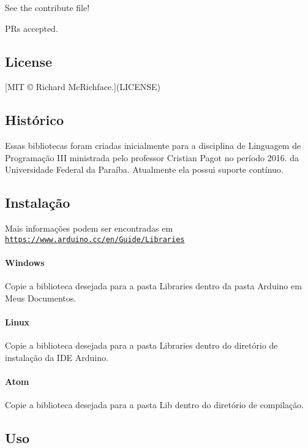 See the contribute file!

P\+Rs accepted.

\subsection*{License}

\mbox{[}M\+IT © Richard Mc\+Richface.\mbox{]}(L\+I\+C\+E\+N\+SE)

\subsection*{Histórico}

Essas bibliotecas foram criadas inicialmente para a disciplina de Linguagem de Programação I\+II ministrada pelo professor Cristian Pagot no período 2016. da Universidade Federal da Paraíba. Atualmente ela possui suporte contínuo.

\subsection*{Instalação}

Mais informações podem ser encontradas em \href{https://www.arduino.cc/en/Guide/Libraries}{\tt https\+://www.\+arduino.\+cc/en/\+Guide/\+Libraries} \paragraph*{Windows}

Copie a biblioteca desejada para a pasta {\ttfamily Libraries} dentro da pasta {\ttfamily Arduino} em {\ttfamily Meus Documentos}.

\paragraph*{Linux}

Copie a biblioteca desejada para a pasta {\ttfamily Libraries} dentro do diretório de instalação da I\+DE Arduino.

\paragraph*{Atom}

Copie a biblioteca desejada para a pasta {\ttfamily Lib} dentro do diretório de compilação.

\subsection*{Uso}

